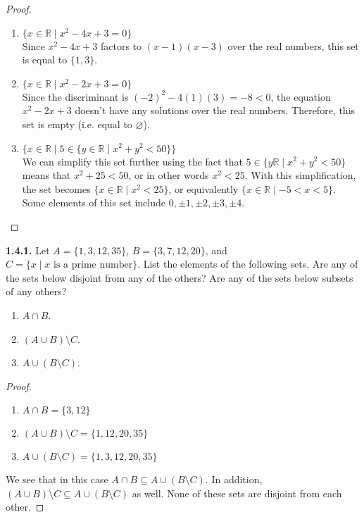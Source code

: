\documentclass[12pt]{amsart}
\newenvironment{statement}[1]{\smallskip\noindent\color[rgb]{.6627, .3529, .6314} {\bf #1.}}{}
\theoremstyle{definition}
\theoremstyle{remark}
\newcommand{\BR}{\mathbb R}
\begin{document}
\begin{proof}
\hfill
\begin{enumerate}
	\item $\{ x \in \BR \mid x^2 - 4x + 3 = 0 \}$ \\
	Since $x^2 - 4x + 3$ factors to $(x - 1)(x - 3)$ over the real numbers, this set is equal to $\{1, 3\}$.
	
	\item $\{ x\in \BR \mid x^2 - 2x + 3 = 0 \}$ \\
	Since the discriminant is $(-2)^2 - 4(1)(3) = -8 < 0$, the equation $x^2 - 2x + 3$ doesn't have any solutions over the real numbers.
	Therefore, this set is empty (i.e. equal to $\varnothing$).
	
	\item $\{ x \in \BR \mid 5 \in \{ y \in \BR \mid x^2 + y^2 < 50 \} \}$ \\
	We can simplify this set further using the fact that $5 \in \{ y \BR \mid x^2 + y^2 < 50 \}$ means that $x^2 + 25 < 50$, or in other words $x^2 < 25$.
	With this simplification, the set becomes $\{ x \in \BR \mid x^2 < 25 \}$, or equivalently $\{ x \in \BR \mid -5 < x < 5 \}$.
	Some elements of this set include $0, \pm 1, \pm 2, \pm 3, \pm 4$.
\end{enumerate}
\end{proof}


\begin{statement}{1.4.1}
Let $A = \{ 1, 3, 12, 35 \}$, $B = \{ 3, 7, 12, 20 \}$, and $C = \{ x \mid x \text{ is a prime number} \}$.
List the elements of the following sets.
Are any of the sets below disjoint from any of the others?
Are any of the sets below subsets of any others?
\begin{enumerate}
	\item $A \cap B$.
	\item $(A \cup B) \setminus C$.
	\item $A \cup (B \setminus C)$.
\end{enumerate}
\end{statement}

\begin{proof}
\hfill
\begin{enumerate}
	\item $A \cap B = \{ 3, 12 \}$
	\item $(A \cup B) \setminus C = \{ 1, 12, 20, 35 \}$
	\item $A \cup (B \setminus C) = \{ 1, 3, 12, 20, 35 \}$
\end{enumerate}
We see that in this case $A \cap B \subseteq A \cup (B \setminus C)$.
In addition, $(A \cup B) \setminus C \subseteq A \cup (B \setminus C)$ as well.
None of these sets are disjoint from each other.
\end{proof}
\end{document}
